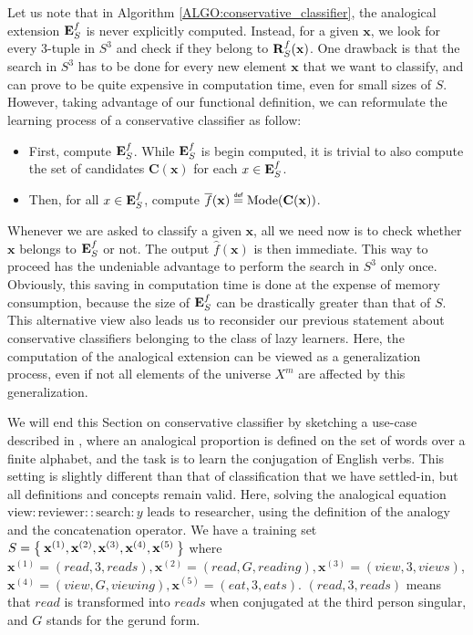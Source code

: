 Let us note that in Algorithm \ref{ALGO:conservative_classifier}, the
analogical extension $\mathbf{E}_{S}^{f}$ is never explicitly computed. Instead, for a given
$\mathbf{x}$, we look for
every 3-tuple in $S^3$ and check if they belong to $\mathbf{R}_{S}^{f}(\mathbf{x})$. One drawback is
that the search in $S^3$ has to be done for every new element $\mathbf{x}$ that
we want to classify, and can prove to be quite expensive in computation time,
even for small sizes of $S$. However, taking advantage of our functional
definition, we can reformulate the learning process of a conservative
classifier as follow:

\begin{itemize}
\item First, compute $\mathbf{E}_{S}^{f}$. While $\mathbf{E}_{S}^{f}$ is begin computed, it is trivial to
  also compute the set of candidates $\mathbf{C}(\mathbf{x})$ for each $x \in
    \mathbf{E}_{S}^{f}$.
  \item Then, for all $x \in\mathbf{E}_{S}^{f}$, compute
    $\albl{\mathbf{x}} \eqdef \text{Mode}(\mathbf{C}(\mathbf{x}))$.
\end{itemize}
\noindent
Whenever we are asked to classify a given $\mathbf{x}$, all we need now is to
check whether $\mathbf{x}$ belongs to $\mathbf{E}_{S}^{f}$ or not. The output
$\hat{f}(\mathbf{x})$ is then immediate. This way to proceed has the undeniable
advantage to perform the search in $S^3$ only once. Obviously, this saving in
computation time is done at the expense of memory consumption, because the
size of $\mathbf{E}_{S}^{f}$ can be drastically greater than that of $S$. This alternative
view also leads us to reconsider our previous statement about conservative
classifiers belonging to the class of lazy learners. Here, the computation of
the analogical extension can be viewed as a generalization process, even if not
all elements of the universe $X^m$ are affected by this generalization.

We will end this Section on conservative classifier by sketching a use-case
described in \cite{StrYvoREPORT05}, where an analogical proportion is defined
on the set of words over a finite alphabet, and the task is to learn the
conjugation of English verbs. This setting is slightly different than that of
classification that we have settled-in, but all definitions and concepts remain
valid. Here, solving the analogical equation
$\text{view}:\text{reviewer}::\text{search}:y$ leads to $\text{researcher}$,
using the definition of the analogy and the concatenation operator.
We have a training set $S=\Set{\mathbf{x}^{(1)},\mathbf{x}^{(2)},
\mathbf{x}^{(3)}, \mathbf{x}^{(4)}, \mathbf{x}^{(5)}}$ where
$\mathbf{x}^{(1)}=(read,3,reads), \mathbf{x}^{(2)}=(read,G,reading),
\mathbf{x}^{(3)}=(view,3,views)$, $\mathbf{x}^{(4)}=(view,G,viewing),
\mathbf{x}^{(5)}=(eat,3,eats)$. $(read,3,reads)$ means that $read$ is
transformed into $reads$ when conjugated at the third person singular, and $G$
stands for the gerund form.

